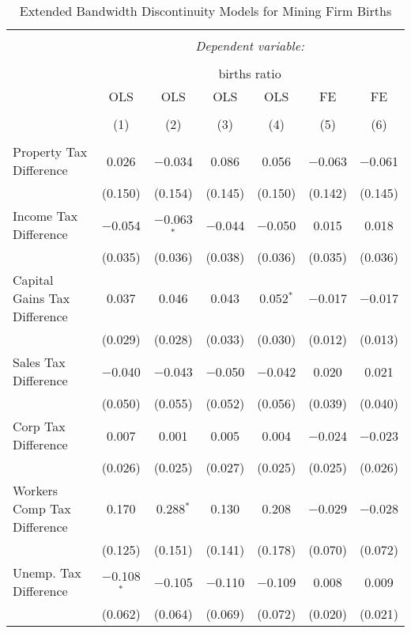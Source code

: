 
\begin{table}[!htbp] \centering 
  \caption{Extended Bandwidth Discontinuity Models for  Mining Firm Births} 
  \label{21eb} 
\begin{tabular}{@{\extracolsep{5pt}}lcccccc} 
\\[-1.8ex]\hline 
\hline \\[-1.8ex] 
 & \multicolumn{6}{c}{\textit{Dependent variable:}} \\ 
\cline{2-7} 
\\[-1.8ex] & \multicolumn{6}{c}{births ratio} \\ 
 & OLS & OLS & OLS & OLS & FE & FE \\ 
\\[-1.8ex] & (1) & (2) & (3) & (4) & (5) & (6)\\ 
\hline \\[-1.8ex] 
 Property Tax Difference & 0.026 & $-$0.034 & 0.086 & 0.056 & $-$0.063 & $-$0.061 \\ 
  & (0.150) & (0.154) & (0.145) & (0.150) & (0.142) & (0.145) \\ 
  Income Tax Difference & $-$0.054 & $-$0.063$^{*}$ & $-$0.044 & $-$0.050 & 0.015 & 0.018 \\ 
  & (0.035) & (0.036) & (0.038) & (0.036) & (0.035) & (0.036) \\ 
  Capital Gains Tax Difference & 0.037 & 0.046 & 0.043 & 0.052$^{*}$ & $-$0.017 & $-$0.017 \\ 
  & (0.029) & (0.028) & (0.033) & (0.030) & (0.012) & (0.013) \\ 
  Sales Tax Difference & $-$0.040 & $-$0.043 & $-$0.050 & $-$0.042 & 0.020 & 0.021 \\ 
  & (0.050) & (0.055) & (0.052) & (0.056) & (0.039) & (0.040) \\ 
  Corp Tax Difference & 0.007 & 0.001 & 0.005 & 0.004 & $-$0.024 & $-$0.023 \\ 
  & (0.026) & (0.025) & (0.027) & (0.025) & (0.025) & (0.026) \\ 
  Workers Comp Tax Difference & 0.170 & 0.288$^{*}$ & 0.130 & 0.208 & $-$0.029 & $-$0.028 \\ 
  & (0.125) & (0.151) & (0.141) & (0.178) & (0.070) & (0.072) \\ 
  Unemp. Tax Difference & $-$0.108$^{*}$ & $-$0.105 & $-$0.110 & $-$0.109 & 0.008 & 0.009 \\ 
  & (0.062) & (0.064) & (0.069) & (0.072) & (0.020) & (0.021) \\ 

\end{tabular}
\end{table}
